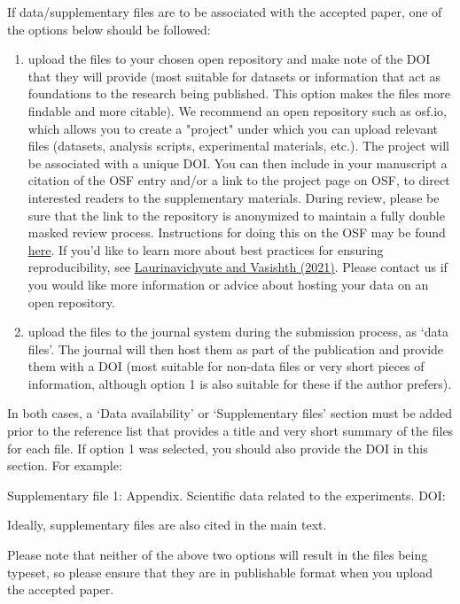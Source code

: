 \documentclass[times,linguex,xcolor]{glossa}
\begin{document}
If data/supplementary files are to be associated with the accepted paper, one of the options below should be followed:
\begin{enumerate}
\item upload the files to your chosen open repository and make note of the DOI that they will provide (most suitable for datasets or information that act as foundations to the research being published. This option makes the files more findable and more citable). We recommend an open repository such as osf.io, which allows you to create a "project" under which you can upload relevant files (datasets, analysis scripts, experimental materials, etc.). The project will be associated with a unique DOI. You can then include in your manuscript a citation of the OSF entry and/or a link to the project page on OSF, to direct interested readers to the supplementary materials. During review, please be sure that the link to the repository is anonymized to maintain a fully double masked review process. Instructions for doing this on the OSF may be found \href{https://help.osf.io/hc/en-us/articles/360019930333-Create-a-View-only-Link-for-a-Project}{here}. If you'd like to learn more about best practices for ensuring reproducibility, see \href{https://psyarxiv.com/hf297/}{Laurinavichyute and Vasishth (2021)}. Please contact us if you would like more information or advice about hosting your data on an open repository.
\item upload the files to the journal system during the submission process, as `data files'. The journal will then host them as part of the publication and provide them with a DOI (most suitable for non-data files or very short pieces of information, although option 1 is also suitable for these if the author prefers).
\end{enumerate}

\noindent In both cases, a `Data availability' or `Supplementary files' section must be added prior to the reference list that provides a title and very short summary of the files for each file. If option 1 was selected, you should also provide the DOI in this section. For example:

\noindent Supplementary file 1: Appendix. Scientific data related to the experiments. DOI: 

Ideally, supplementary files are also cited in the main text.

Please note that neither of the above two options will result in the files being typeset, so please ensure that they are in publishable format when you upload the accepted paper.
\end{document}
